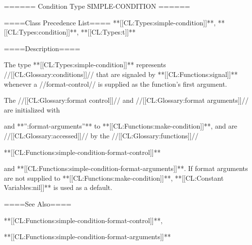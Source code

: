 ====== Condition Type SIMPLE-CONDITION ======

====Class Precedence List==== **[[CL:Types:simple-condition]]**, **[[CL:Types:condition]]**, **[[CL:Types:t]]**

====Description====

The type **[[CL:Types:simple-condition]]** represents //[[CL:Glossary:conditions]]// that are signaled by **[[CL:Functions:signal]]** whenever a //format-control// is supplied as the function's first argument.

The //[[CL:Glossary:format control]]// and //[[CL:Glossary:format arguments]]// are initialized with 

and **'':format-arguments''** to **[[CL:Functions:make-condition]]**, and are //[[CL:Glossary:accessed]]// by the //[[CL:Glossary:functions]]//

**[[CL:Functions:simple-condition-format-control]]**

and **[[CL:Functions:simple-condition-format-arguments]]**. If format arguments are not supplied to **[[CL:Functions:make-condition]]**, **[[CL:Constant Variables:nil]]** is used as a default.

====See Also====

**[[CL:Functions:simple-condition-format-control]]**,

**[[CL:Functions:simple-condition-format-arguments]]**

  
